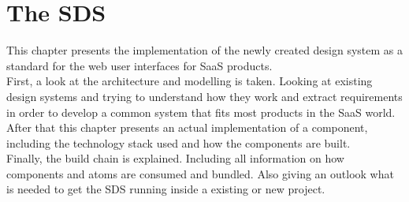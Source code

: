 \newpage
\section{The \ac*{SDS}}
This chapter presents the implementation of the newly created design system as a standard for the web user interfaces for SaaS products. \\
First, a look at the architecture and modelling is taken. Looking at existing design systems and trying to understand  how they work and extract requirements in order to develop a common system that fits most products in the SaaS world. \\
After that this chapter presents an actual implementation of a component, including the technology stack used and how the components are built. \\
Finally, the build chain is explained. Including all information on how components and atoms are consumed and bundled. Also giving an outlook what is needed to get the \ac{SDS} running inside a existing or new project.



